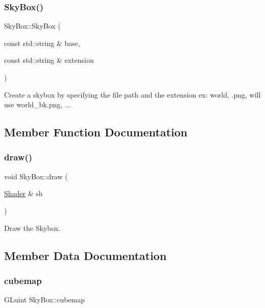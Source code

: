 \subsubsection{\texorpdfstring{Sky\+Box()}{SkyBox()}}
{\footnotesize\ttfamily Sky\+Box\+::\+Sky\+Box (\begin{DoxyParamCaption}\item[{const std\+::string \&}]{base,  }\item[{const std\+::string \&}]{extension }\end{DoxyParamCaption})}



Create a skybox by specifying the file path and the extension ex\+: world, .png, will use world\+\_\+bk.\+png, ... 



\subsection{Member Function Documentation}
\mbox{\label{classSkyBox_a366982874c361360c654015e794b1e22}} 
\subsubsection{\texorpdfstring{draw()}{draw()}}
{\footnotesize\ttfamily void Sky\+Box\+::draw (\begin{DoxyParamCaption}\item[{\hyperlink{classShader}{Shader} \&}]{sh }\end{DoxyParamCaption})}



Draw the Skybox. 



\subsection{Member Data Documentation}
\mbox{\label{classSkyBox_ad62d8584917884e9f154421ea637888b}} 
\subsubsection{\texorpdfstring{cubemap}{cubemap}}
{\footnotesize\ttfamily G\+Luint Sky\+Box\+::cubemap\hspace{0.3cm}{\ttfamily [protected]}}

